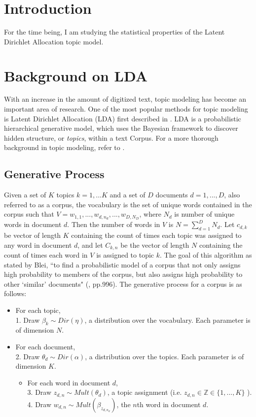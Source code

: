 \documentclass[3p,times]{elsarticle}
\begin{document}





\section{Introduction}
For the time being, I am studying the statistical properties of the Latent Dirichlet Allocation topic model.

\section{Background on LDA}
With an increase in the amount of digitized text, topic modeling has become an important area of research. One of the most popular methods for topic modeling is Latent Dirichlet Allocation (LDA) first described in \cite{lda}. LDA is a probabilistic hierarchical generative model, which uses the Bayesian framework to discover hidden structure, or \textit{topics},  within a text Corpus. For a more thorough background in topic modeling, refer to \cite{news}.

\subsection{Generative Process}
Given a set of $K$ topics $k=1,...K$ and a set of $D$ documents $d=1,...,D$, also referred to as a corpus, the vocabulary is the set of unique words contained in the corpus such that $V=w_{1,1},...,w_{d,n_{d}},...,w_{D,N_{D}}$, where $N_{d}$ is number of unique words in document $d$. Then the number of words in $V$ is $N=\sum_{d=1}^{D}{N_{d}}$. Let $c_{d,k}$ be vector of length $K$ containing the count of times each topic was assigned to any word in document $d$, and let $C_{k,n}$ be the vector of length $N$ containing the count of times each word in $V$ is assigned to topic $k$. The goal of this algorithm as stated by Blei, ``to find a probabilistic model of a corpus that not only assigns high probability to members of the corpus, but also assigns high probability to other `similar' documents" (\cite{lda}, pp.996). The generative process for a corpus is as follows:
\begin{itemize}
\item For each topic, \\
	1. Draw $\beta_{k} \sim Dir(\eta)$, a distribution over the vocabulary. Each parameter is of dimension $N$.

\item For each document, \\
	2. Draw $\theta_{d} \sim Dir(\alpha)$, a distribution over the topics. Each parameter is of dimension $K$.
		\begin{itemize}
		\item For each word in document $d$, \\
			3. Draw $z_{d,n} \sim Mult(\theta_{d})$, a topic assignment (i.e. $z_{d,n} \in \mathbb{Z} \in \{1,...,K\}$ ). \\
			4. Draw $w_{d,n} \sim Mult(\beta_{z_{d,n_{d}}})$, the $n$th word in document $d$.
	\end{itemize}
\end{itemize}
\end{document}
